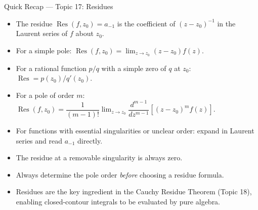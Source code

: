 \documentclass[12pt,a4paper]{article}
\begin{document}
\begin{learnbox}{Quick Recap --- Topic 17: Residues}
\begin{itemize}[leftmargin=*]
  \item The residue $\operatorname{Res}(f,z_0) = a_{-1}$ is the coefficient of $(z-z_0)^{-1}$ in the Laurent series of $f$ about $z_0$.
  \item For a simple pole: $\operatorname{Res}(f,z_0) = \lim_{z\to z_0}(z-z_0)f(z)$.
  \item For a rational function $p/q$ with a simple zero of $q$ at $z_0$: $\operatorname{Res} = p(z_0)/q'(z_0)$.
  \item For a pole of order $m$: $\operatorname{Res}(f,z_0) = \dfrac{1}{(m-1)!}\lim_{z\to z_0}\dfrac{d^{m-1}}{dz^{m-1}}\!\left[(z-z_0)^m f(z)\right]$.
  \item For functions with essential singularities or unclear order: expand in Laurent series and read $a_{-1}$ directly.
  \item The residue at a removable singularity is always zero.
  \item Always determine the pole order \emph{before} choosing a residue formula.
  \item Residues are the key ingredient in the Cauchy Residue Theorem (Topic 18), enabling closed-contour integrals to be evaluated by pure algebra.
\end{itemize}
\end{learnbox}
\end{document}
